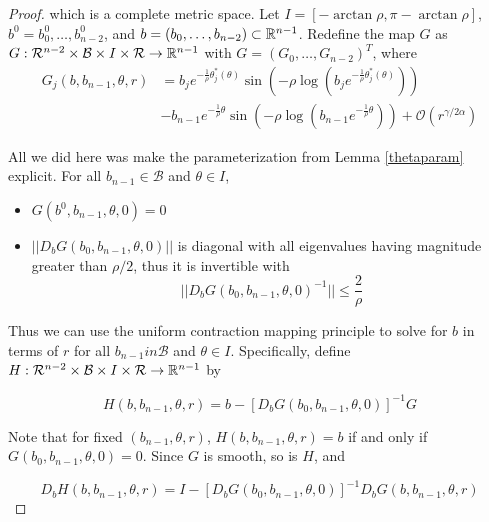 \documentclass[thesis.tex]{subfiles}
\begin{document}
\begin{theorem}
\begin{proof}
which is a complete metric space. Let $I = [-\arctan \rho, \pi - \arctan \rho]$, $b^0 = b_0^0, \dots, b_{n-2}^0$, and $b = (b_0, \dots, b_{n-2}) \subset {\mathbb R}^{n-1}$. Redefine the map $G$ as $G: \mathcal{R}^{n-2} \times \mathcal{B} \times I \times \mathcal{R} \rightarrow {\mathbb R}^{n-1}$ with $G = (G_0, \dots, G_{n-2})^T$, where 
\begin{align*}
G_j(b, b_{n-1}, \theta, r) &= b_j e^{-\frac{1}{\rho} \theta_j^*(\theta)} \sin \left( -\rho \log \left( b_j e^{-\frac{1}{\rho} \theta_j^*(\theta)} \right) \right) \\
&- b_{n-1} e^{-\frac{1}{\rho} \theta} \sin \left( -\rho \log \left( b_{n-1} e^{-\frac{1}{\rho} \theta} \right) \right) + \mathcal{O}(r^{\gamma / 2 \alpha})
\end{align*}

All we did here was make the parameterization from Lemma \ref{thetaparam} explicit. For all $b_{n-1} \in \mathcal{B}$ and $\theta \in I$,

\begin{itemize}
\item $G(b^0, b_{n-1}, \theta, 0) = 0$
\item $||D_b G(b_0, b_{n-1}, \theta, 0)||$ is diagonal with all eigenvalues having magnitude greater than $\rho/2$, thus it is invertible with 
\begin{equation}\label{DbGinvbound}
||D_b G(b_0, b_{n-1}, \theta, 0)^{-1}|| \leq \frac{2}{\rho}
\end{equation}
\end{itemize}

Thus we can use the uniform contraction mapping principle to solve for $b$ in terms of $r$ for all $b_{n-1} in \mathcal{B}$ and $\theta \in I$. Specifically, define $H: \mathcal{R}^{n-2} \times \mathcal{B} \times I \times \mathcal{R} \rightarrow {\mathbb R}^{n-1}$ by

\begin{equation}\label{defHb}
H(b, b_{n-1}, \theta, r) = b - [D_b G(b_0, b_{n-1}, \theta, 0)]^{-1} G
\end{equation}

Note that for fixed $(b_{n-1}, \theta, r)$, $H(b, b_{n-1}, \theta, r) = b$ if and only if $G(b_0, b_{n-1}, \theta, 0) = 0$. Since $G$ is smooth, so is $H$, and 

\begin{equation}\label{DbH}
D_b H(b, b_{n-1}, \theta, r) = I - [D_b G(b_0, b_{n-1}, \theta, 0)]^{-1} D_b G(b, b_{n-1}, \theta, r)
\end{equation}


\end{proof}
\end{theorem}
\end{document}
